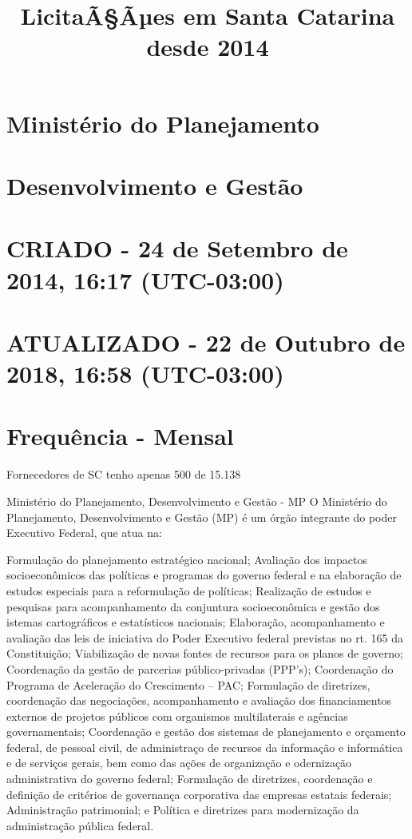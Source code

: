 \documentclass[]{article}
\title{LicitaÃ§Ãµes em Santa Catarina desde 2014}
\author{}
\date{}
\begin{document}
\maketitle

\section{Ministério do Planejamento}\label{ministerio-do-planejamento}

\section{Desenvolvimento e Gestão}\label{desenvolvimento-e-gestao}

\section{CRIADO - 24 de Setembro de 2014, 16:17
(UTC-03:00)}\label{criado---24-de-setembro-de-2014-1617-utc-0300}

\section{ATUALIZADO - 22 de Outubro de 2018, 16:58
(UTC-03:00)}\label{atualizado---22-de-outubro-de-2018-1658-utc-0300}

\section{Frequência - Mensal}\label{frequencia---mensal}

Fornecedores de SC tenho apenas 500 de 15.138

Ministério do Planejamento, Desenvolvimento e Gestão - MP O Ministério
do Planejamento, Desenvolvimento e Gestão (MP) é um órgão integrante do
poder Executivo Federal, que atua na:

Formulação do planejamento estratégico nacional; Avaliação dos impactos
socioeconômicos das políticas e programas do governo federal e na
elaboração de estudos especiais para a reformulação de políticas;
Realização de estudos e pesquisas para acompanhamento da conjuntura
socioeconômica e gestão dos istemas cartográficos e estatísticos
nacionais; Elaboração, acompanhamento e avaliação das leis de iniciativa
do Poder Executivo federal previstas no rt. 165 da Constituição;
Viabilização de novas fontes de recursos para os planos de governo;
Coordenação da gestão de parcerias público-privadas (PPP's); Coordenação
do Programa de Aceleração do Crescimento -- PAC; Formulação de
diretrizes, coordenação das negociações, acompanhamento e avaliação dos
financiamentos externos de projetos públicos com organismos
multilaterais e agências governamentais; Coordenação e gestão dos
sistemas de planejamento e orçamento federal, de pessoal civil, de
administraço de recursos da informação e informática e de serviços
gerais, bem como das ações de organização e odernização administrativa
do governo federal; Formulação de diretrizes, coordenação e definição de
critérios de governança corporativa das empresas estatais federais;
Administração patrimonial; e Política e diretrizes para modernização da
administração pública federal.
\end{document}
